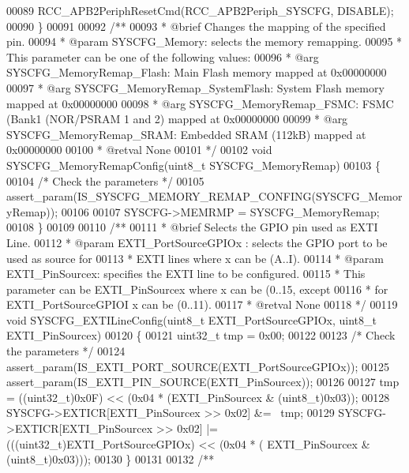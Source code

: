 \begin{DoxyCode}
00089    RCC_APB2PeriphResetCmd(RCC_APB2Periph_SYSCFG, DISABLE);
00090 \}
00091 
00092 \textcolor{comment}{/**}
00093 \textcolor{comment}{  * @brief  Changes the mapping of the specified pin.}
00094 \textcolor{comment}{  * @param  SYSCFG\_Memory: selects the memory remapping.}
00095 \textcolor{comment}{  *         This parameter can be one of the following values:}
00096 \textcolor{comment}{  *            @arg SYSCFG\_MemoryRemap\_Flash:       Main Flash memory mapped at 0x00000000  }
00097 \textcolor{comment}{  *            @arg SYSCFG\_MemoryRemap\_SystemFlash: System Flash memory mapped at 0x00000000}
00098 \textcolor{comment}{  *            @arg SYSCFG\_MemoryRemap\_FSMC:        FSMC (Bank1 (NOR/PSRAM 1 and 2) mapped at
       0x00000000}
00099 \textcolor{comment}{  *            @arg SYSCFG\_MemoryRemap\_SRAM:        Embedded SRAM (112kB) mapped at 0x00000000}
00100 \textcolor{comment}{  * @retval None}
00101 \textcolor{comment}{  */}
00102 \textcolor{keywordtype}{void} SYSCFG_MemoryRemapConfig(uint8\_t SYSCFG\_MemoryRemap)
00103 \{
00104   \textcolor{comment}{/* Check the parameters */}
00105   assert_param(IS\_SYSCFG\_MEMORY\_REMAP\_CONFING(SYSCFG\_MemoryRemap));
00106 
00107   SYSCFG->MEMRMP = SYSCFG\_MemoryRemap;
00108 \}
00109 
00110 \textcolor{comment}{/**}
00111 \textcolor{comment}{  * @brief  Selects the GPIO pin used as EXTI Line.}
00112 \textcolor{comment}{  * @param  EXTI\_PortSourceGPIOx : selects the GPIO port to be used as source for}
00113 \textcolor{comment}{  *          EXTI lines where x can be (A..I).}
00114 \textcolor{comment}{  * @param  EXTI\_PinSourcex: specifies the EXTI line to be configured.}
00115 \textcolor{comment}{  *           This parameter can be EXTI\_PinSourcex where x can be (0..15, except}
00116 \textcolor{comment}{  *           for EXTI\_PortSourceGPIOI x can be (0..11).}
00117 \textcolor{comment}{  * @retval None}
00118 \textcolor{comment}{  */}
00119 \textcolor{keywordtype}{void} SYSCFG_EXTILineConfig(uint8\_t EXTI\_PortSourceGPIOx, uint8\_t EXTI\_PinSourcex)
00120 \{
00121   uint32\_t tmp = 0x00;
00122 
00123   \textcolor{comment}{/* Check the parameters */}
00124   assert_param(IS\_EXTI\_PORT\_SOURCE(EXTI\_PortSourceGPIOx));
00125   assert_param(IS\_EXTI\_PIN\_SOURCE(EXTI\_PinSourcex));
00126 
00127   tmp = ((uint32\_t)0x0F) << (0x04 * (EXTI\_PinSourcex & (uint8\_t)0x03));
00128   SYSCFG->EXTICR[EXTI\_PinSourcex >> 0x02] &= ~tmp;
00129   SYSCFG->EXTICR[EXTI\_PinSourcex >> 0x02] |= (((uint32\_t)EXTI\_PortSourceGPIOx) << (0x04 * (
      EXTI\_PinSourcex & (uint8\_t)0x03)));
00130 \}
00131 
00132 \textcolor{comment}{/**}

\end{DoxyCode}

